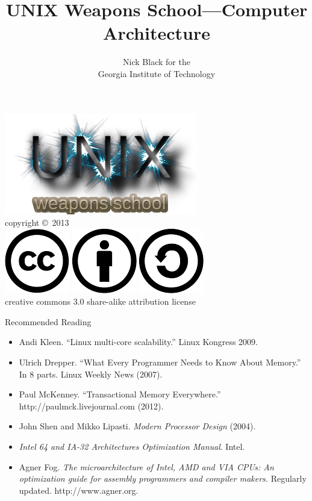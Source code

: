 \documentclass[xcolor={dvipsnames,table}]{beamer}
\title{UNIX Weapons School---Computer Architecture}
\date{}
\author{Nick Black for the\\
Georgia Institute of Technology
}
\begin{document}
\begin{frame}
\titlepage
\begin{center}
\includegraphics[scale=0.33]{images/uws.png}\\
\vspace{.1in}
\tiny{copyright \copyright\ 2013}\\
\includegraphics[scale=.25]{images/cc-logo.pdf}
\includegraphics[scale=.25]{images/cc-new.pdf}
\includegraphics[scale=.25]{images/cc-share.pdf}\\
\tiny{creative commons 3.0 share-alike attribution license}
\end{center}
\end{frame}

\begin{frame}{Recommended Reading}
\small
\begin{itemize}
\item Andi Kleen. ``Linux multi-core scalability.'' Linux Kongress 2009.
\item Ulrich Drepper. ``What Every Programmer Needs to Know About Memory.'' In 8 parts. Linux Weekly News (2007).
\item Paul McKenney. ``Transactional Memory Everywhere.''\\
http://paulmck.livejournal.com (2012).
\item John Shen and Mikko Lipasti. \textit{Modern Processor Design} (2004).
\item \textit{Intel 64 and IA-32 Architectures Optimization Manual}. Intel.
\item Agner Fog. \textit{The microarchitecture of Intel, AMD and VIA CPUs: An optimization guide for assembly programmers and compiler makers.}
Regularly updated. http://www.agner.org.
\end{itemize}
\end{frame}
\end{document}
